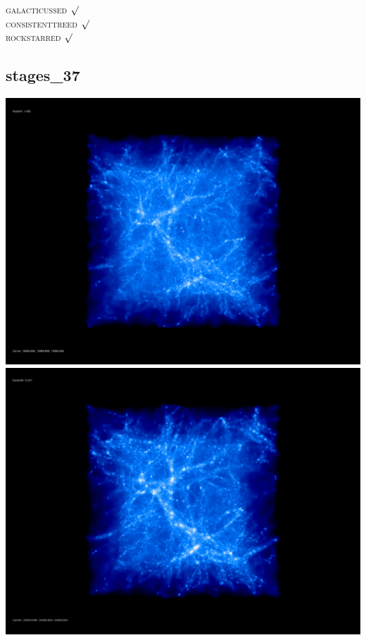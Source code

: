 \textsc{galacticussed} $\surd$ \\
\textsc{consistenttreed} $\surd$ \\ 
\textsc{rockstarred} $\surd$

% 
%
%
%
%
%
%
%


\newpage
\subsection{stages\_37}

\includegraphics[scale=0.1]{r256/stages_37/50.jpg} 
\includegraphics[scale=0.1]{r256/stages_37/100.jpg}  \\

